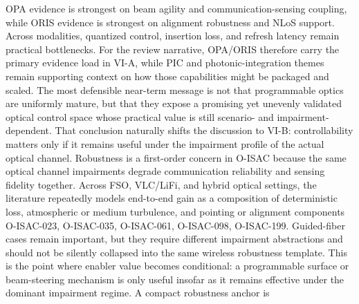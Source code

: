 {}\markdownRendererParagraphSeparator
{} OPA evidence is strongest on beam agility and communication-sensing coupling, while ORIS evidence is strongest on alignment robustness and NLoS support. Across modalities, quantized control, insertion loss, and refresh latency remain practical bottlenecks. For the review narrative, OPA/ORIS therefore carry the primary evidence load in VI-A, while PIC and photonic-integration themes remain supporting context on how those capabilities might be packaged and scaled. The most defensible near-term message is not that programmable optics are uniformly mature, but that they expose a promising yet unevenly validated optical control space whose practical value is still scenario- and impairment-dependent. That conclusion naturally shifts the discussion to VI-B: controllability matters only if it remains useful under the impairment profile of the actual optical channel.\markdownRendererInterblockSeparator
{}
\markdownRendererSectionEnd \markdownRendererSectionBegin
{}\markdownRendererInterblockSeparator
{}Robustness is a first-order concern in O-ISAC because the same optical channel impairments degrade communication reliability and sensing fidelity together. Across FSO, VLC/LiFi, and hybrid optical settings, the literature repeatedly models end-to-end gain as a composition of deterministic loss, atmospheric or medium turbulence, and pointing or alignment components O-ISAC-023, O-ISAC-035, O-ISAC-061, O-ISAC-098, O-ISAC-199. Guided-fiber cases remain important, but they require different impairment abstractions and should not be silently collapsed into the same wireless robustness template. This is the point where enabler value becomes conditional: a programmable surface or beam-steering mechanism is only useful insofar as it remains effective under the dominant impairment regime.\markdownRendererParagraphSeparator
{}A compact robustness anchor is\markdownRendererParagraphSeparator
